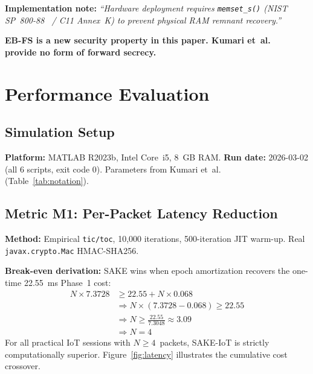 \documentclass[conference]{IEEEtran}
\begin{document}
\noindent\textbf{Implementation note:}
\emph{``Hardware deployment requires \texttt{memset\_s()} (NIST SP~800-88~\cite{nist80088}
/ C11 Annex~K) to prevent physical RAM remnant recovery.''}

\noindent\textbf{EB-FS is a new security property in this paper.
Kumari et~al.~\cite{kumari2022} provide no form of forward secrecy.}

\section{Performance Evaluation}
\label{sec:eval}

\subsection{Simulation Setup}

\textbf{Platform:} MATLAB R2023b, Intel Core~i5, 8~GB RAM.
\textbf{Run date:} 2026-03-02 (all 6 scripts, exit code 0).
Parameters from Kumari et~al.~\cite{kumari2022} (Table~\ref{tab:notation}).

\subsection{Metric M1: Per-Packet Latency Reduction}

\textbf{Method:} Empirical \texttt{tic/toc}, 10,000 iterations,
500-iteration JIT warm-up. Real \texttt{javax.crypto.Mac} HMAC-SHA256.

\noindent\textbf{Break-even derivation:} SAKE wins when epoch amortization
recovers the one-time 22.55~ms Phase~1 cost:
\begin{align}
N \times 7.3728 &\geq 22.55 + N \times 0.068 \\
&\Rightarrow N \times (7.3728 - 0.068) \geq 22.55 \\
&\Rightarrow N \geq \frac{22.55}{7.3048} \approx 3.09 \\
&\Rightarrow N = 4
\end{align}
For all practical IoT sessions with $N \geq 4$~packets, SAKE-IoT is
strictly computationally superior. Figure~\ref{fig:latency} illustrates
the cumulative cost crossover.
\end{document}

